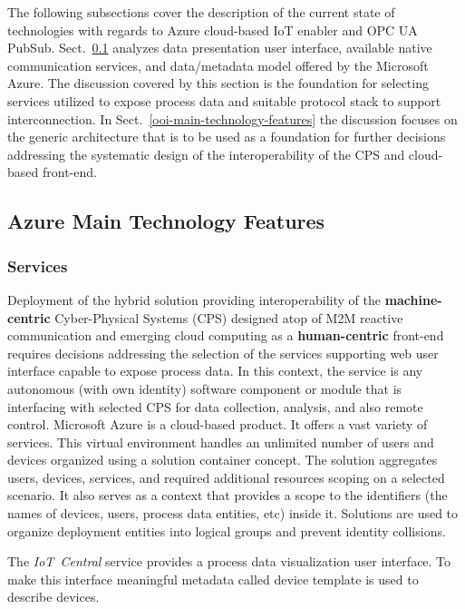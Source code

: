 \documentclass{jacsart}
\begin{document}
The following subsections cover the description of the current state of technologies with regards to Azure cloud-based IoT enabler and OPC UA PubSub. Sect.~\ref*{azure-main-technology-features} analyzes data presentation user interface, available native communication services, and data/metadata model offered by the Microsoft Azure. The discussion covered by this section is the foundation for selecting services utilized to expose process data and suitable protocol stack to support interconnection. In Sect.~\ref*{ooi-main-technology-features} the discussion focuses on the generic architecture that is to be used as a foundation for further decisions addressing the systematic design of the interoperability of the CPS and cloud-based front-end.

\subsection{Azure Main Technology Features}\label{azure-main-technology-features}

\subsubsection{Services}\label{services}

Deployment of the hybrid solution providing interoperability of the \textbf{machine-centric} Cyber-Physical Systems (CPS) designed atop of M2M reactive communication and emerging cloud computing as a \textbf{human-centric} front-end requires decisions addressing the selection of the services supporting web user interface capable to expose process data. In this context, the service is any autonomous (with own identity) software component or module that is interfacing with selected CPS for data collection, analysis, and also remote control. Microsoft Azure is a cloud-based product. It offers a vast variety of services. This virtual environment handles an unlimited number of users and devices organized using a solution container concept. The solution aggregates users, devices, services, and required additional resources scoping on a selected scenario. It also serves as a context that provides a scope to the identifiers (the names of devices, users, process data entities, etc) inside it. Solutions are used to organize deployment entities into logical groups and prevent identity collisions.

The \textit{IoT\ Central} service provides a process data visualization
user interface. To make this interface meaningful metadata called device
template is used to describe devices.
\end{document}
